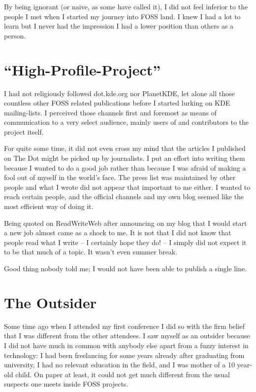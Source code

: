 By being ignorant (or naive, as some have called it), I did not feel inferior to
the people I met when I started my journey into FOSS land. I knew I had a lot to
learn but I never had the impression I had a lower position than others as a
person.

\section*{``High-Profile-Project''}

I had not religiously followed dot.kde.org nor PlanetKDE, let alone all those
countless other FOSS related publications before I started lurking on KDE
mailing-lists. I perceived those channels first and foremost as means of
communication to a very select audience, mainly users of and contributors to the
project itself. 

For quite some time, it did not even cross my mind that the articles I published
on The Dot might be picked up by journalists. I put an effort into writing them
because I wanted to do a good job rather than because I was afraid of making a
fool out of myself in the world's face. The press list was maintained by other
people and what I wrote did not appear that important to me either. I wanted to
reach certain people, and the official channels and my own blog seemed like the
most efficient way of doing it.

Being quoted on ReadWriteWeb after announcing on my blog that I would start a
new job almost came as a shock to me. It is not that I did not know that people
read what I write -- I certainly hope they do! -- I simply did not expect it to
be that much of a topic. It wasn't even summer break.

Good thing nobody told me; I would not have been able to publish a single line.

\section*{The Outsider}

Some time ago when I attended my first conference I did so with the firm belief
that I was different from the other attendees. I saw myself as an outsider
because I did not have much in common with anybody else apart from a fuzzy
interest in technology: I had been freelancing for some years already after
graduating from university, I had no relevant education in the field, and I was
mother of a 10 year-old child. On paper at least, it could not get much
different from the usual suspects one meets inside FOSS projects.

